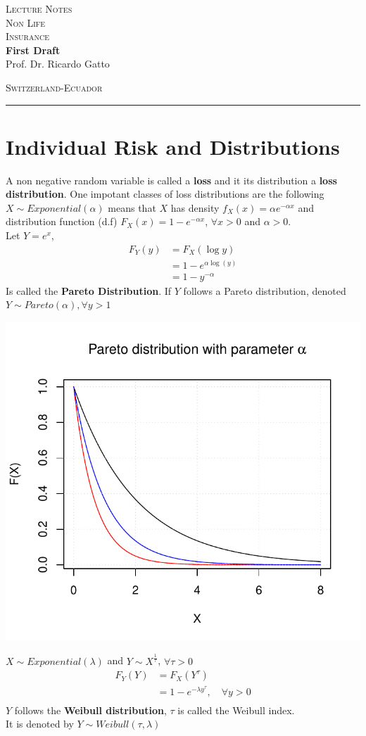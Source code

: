 \documentclass[11pt,a4paper,oneside]{article}\usepackage[]{graphicx}\usepackage[]{color}
\makeatletter
\def\maxwidth{ %
  \ifdim\Gin@nat@width>\linewidth
    \linewidth
  \else
    \Gin@nat@width
  \fi
}
\newenvironment{knitrout}{}{} %
\newcommand*{\titleBOOK}{\begingroup
\centering
\vspace*{\baselineskip}
\vspace*{\baselineskip}
{\Huge\scshape Lecture Notes}\\[10mm]
{\Huge\scshape Non Life  \\[5mm]
Insurance} \\ [\baselineskip]
{\Large\bfseries First Draft}\\[0.3 \textheight]
{\Large Prof. Dr. Ricardo Gatto}\\
\vfill
\begin{center}
{\scshape Switzerland-Ecuador}\\
\rule{\textwidth}{0.5pt}
\end{center}
\vspace*{\baselineskip}
\endgroup}
\makeatother
\begin{document}
\titleBOOK
\newpage

\tableofcontents
\newpage


\section{Individual Risk and Distributions}
A non negative random variable is called a \textbf{loss} and it its distribution a \textbf{loss distribution}. One impotant classes of loss distributions are the following\\

$X\sim Exponential(\alpha)$ means that $X$ has density $f_X(x)=\alpha e^{-\alpha x}$ and distribution function (d.f) $F_X(x)=1-e^{-\alpha x}$, $\forall x>0$ and $\alpha>0$.\\

Let $Y=e^x$, 
\begin{align*}
F_Y(y) &= F_X(\log y)\\
&=1-e^{\alpha \log (y)}\\
&=1-y^{-\alpha}
\end{align*}
Is called the \textbf{Pareto Distribution}. If $Y$ follows a Pareto distribution, denoted  $Y\sim Pareto(\alpha),\forall y>1$

\begin{knitrout}
\color{fgcolor}

{\centering \includegraphics[width=\maxwidth]{figure/unnamed-chunk-1-1} 

}



\end{knitrout}
$X\sim Exponential (\lambda)$ and $Y\sim X^{\frac{1}{\tau}}$, $\forall \tau>0$
\begin{align*}
F_Y(Y) &= F_X(Y^{\tau})\\
&=1-e^{-\lambda y^{\tau}}, \quad \forall y>0\\
\end{align*}
$Y$ follows the \textbf{Weibull distribution}, $\tau$ is called the Weibull index.\\ It is denoted by $Y\sim Weibull(\tau,\lambda)$
\end{document}
